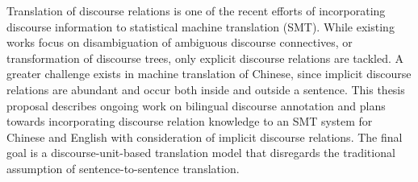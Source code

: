Translation of discourse relations is one of the recent efforts of incorporating discourse information to statistical machine translation (SMT). While existing works focus on disambiguation of ambiguous discourse connectives, or transformation of discourse trees, only explicit discourse relations are tackled. A greater challenge exists in machine translation of Chinese, since implicit discourse relations are abundant and occur both inside and outside a sentence.   This thesis proposal describes ongoing work on bilingual discourse annotation and plans  towards incorporating discourse relation knowledge to an SMT system for Chinese and English with consideration of implicit discourse relations. The final goal is a discourse-unit-based translation model that disregards the traditional assumption of sentence-to-sentence translation.
